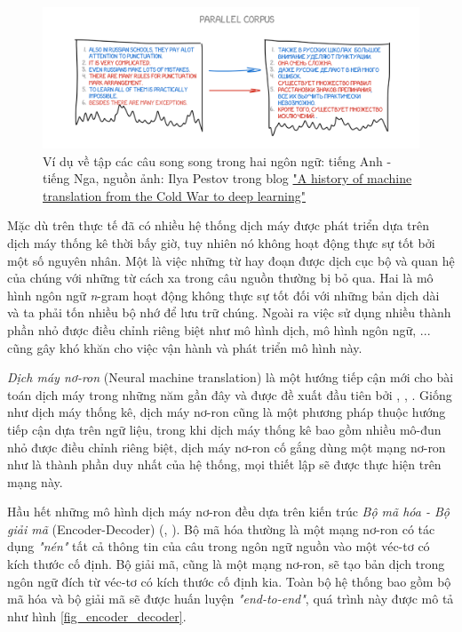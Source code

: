 \begin{figure}
	\centering
	\includegraphics[width=\textwidth]{smt}
	\caption[Ví dụ về tập các câu song song trong hai ngôn ngữ]{Ví dụ về tập các câu song song trong hai ngôn ngữ: tiếng Anh - tiếng Nga, nguồn ảnh: Ilya Pestov trong blog \href{https://medium.freecodecamp.org/a-history-of-machine-translation-from-the-cold-war-to-deep-learning-f1d335ce8b5}{"A history of machine translation from the Cold War to deep learning"} }
	\label{fig_parallelcorpus}
\end{figure}

Mặc dù trên thực tế đã có nhiều hệ thống dịch máy được phát triển dựa trên dịch máy thống kê thời bấy giờ, tuy nhiên nó không hoạt động thực sự tốt bởi một số nguyên nhân. Một là việc những từ hay đoạn được dịch cục bộ và quan hệ của chúng với những từ cách xa trong câu nguồn thường bị bỏ qua. Hai là mô hình ngôn ngữ \textit{n}-gram hoạt động không thực sự tốt đối với những bản dịch dài và ta phải tốn nhiều bộ nhớ để lưu trữ chúng. Ngoài ra việc sử dụng nhiều thành phần nhỏ được điều chỉnh riêng biệt như mô hình dịch, mô hình ngôn ngữ, ... cũng gây khó khăn cho việc vận hành và phát triển mô hình này.

\textit{Dịch máy nơ-ron} (Neural machine translation) là một hướng tiếp cận mới cho bài toán dịch máy trong những năm gần đây và được đề xuất đầu tiên bởi \cite{kalchbrennerBlunsom}, \cite{Seq2Seq2014}, \cite{cho}. Giống như dịch máy thống kê, dịch máy nơ-ron cũng là một phương pháp thuộc hướng tiếp cận dựa trên ngữ liệu, trong khi dịch máy thống kê bao gồm nhiều mô-đun nhỏ được điều chỉnh riêng biệt, dịch máy nơ-ron cố gắng dùng một mạng nơ-ron như là thành phần duy nhất của hệ thống, mọi thiết lập sẽ được thực hiện trên mạng này. 

Hầu hết những mô hình dịch máy nơ-ron đều dựa trên kiến trúc \textit{Bộ mã hóa - Bộ giải mã} (Encoder-Decoder) (\cite{Seq2Seq2014}, \cite{cho}). Bộ mã hóa thường là một mạng nơ-ron có tác dụng \textit{"nén"} tất cả thông tin của câu trong ngôn ngữ nguồn vào một véc-tơ có kích thước cố định. Bộ giải mã, cũng là một mạng nơ-ron, sẽ tạo bản dịch trong ngôn ngữ đích từ véc-tơ có kích thước cố định kia. Toàn bộ hệ thống bao gồm bộ mã hóa và bộ giải mã sẽ được huấn luyện \textit{"end-to-end"}, quá trình này được mô tả như hình \ref{fig_encoder_decoder}.

